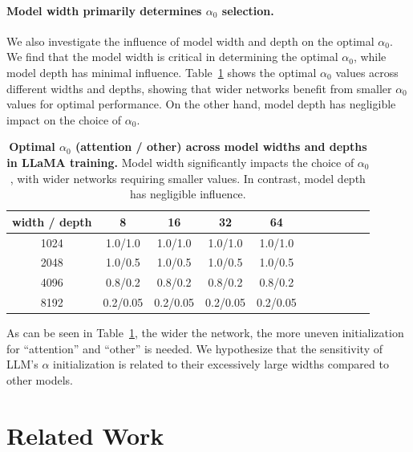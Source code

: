 \paragraph{Model width primarily determines $\alpha_0$ selection.} We also investigate the influence of model width and depth on the optimal $\alpha_0$. We find that the model width is critical in determining the optimal $\alpha_0$, while model depth has minimal influence. Table~\ref{table:width_depth} shows the optimal $\alpha_0$ values across different widths and depths, showing that wider networks benefit from smaller $\alpha_0$ values for optimal performance. On the other hand, model depth has negligible impact on the choice of $\alpha_0$.


\begin{table}[t]
\vskip 0.1in
\centering
{}
\begin{tabular}{ccccccccccc}
\toprule
 width / depth & 8 & 16 & 32 & 64 \\
\midrule
1024 & 1.0/1.0 & 1.0/1.0 & 1.0/1.0 & 1.0/1.0 \\
2048 & 1.0/0.5 & 1.0/0.5 & 1.0/0.5 & 1.0/0.5 \\
4096 & 0.8/0.2 & 0.8/0.2 & 0.8/0.2 & 0.8/0.2 \\
8192 & 0.2/0.05 & 0.2/0.05 & 0.2/0.05 & 0.2/0.05 \\
\midrule
\end{tabular}
\caption{\textbf{Optimal $\alpha_0$ (attention / other) across model widths and depths in LLaMA training.} Model width significantly impacts the choice of $\alpha_0$, with wider networks requiring smaller values. In contrast, model depth has negligible influence.}
\label{table:width_depth}
\end{table}

As can be seen in Table~\ref{table:width_depth}, the wider the network, the more uneven initialization for ``attention'' and ``other'' is needed. We hypothesize that the sensitivity of LLM's $\alpha$ initialization is related to their excessively large widths compared to other models. 









\section{Related Work}

